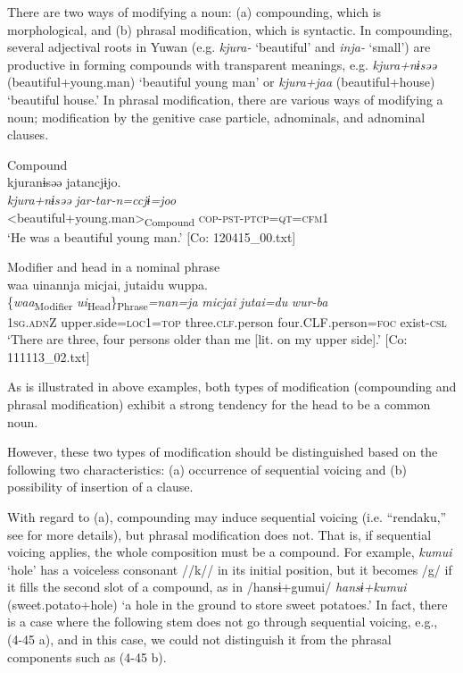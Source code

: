 There are two ways of modifying a noun: (a) compounding, which is morphological, and (b) phrasal modification, which is syntactic. In compounding, several adjectival roots in Yuwan (e.g. \textit{kjura-} ‘beautiful’ and \textit{inja-} ‘small’) are productive in forming compounds with transparent meanings, e.g. \textit{kjura+nɨsəə} (beautiful+young.man) ‘beautiful young man’ or \textit{kjura+jaa} (beautiful+house) ‘beautiful house.’ In phrasal modification, there are various ways of modifying a noun; modification by the genitive case particle, adnominals, and adnominal clauses.

\ea  \label{ex:4.45}
\ea Compound \label{ex:4.45a}\\
\glll   kjuranɨsəə  jatancjɨjo.\\
      \textit{kjura+nɨsəə}  \textit{jar-tar-n=ccjɨ=joo}\\
      <beautiful+young.man>\textsubscript{Compound}  \textsc{cop}-\textsc{pst}-\textsc{ptcp}=\textsc{qt}=\textsc{cfm}1\\
      \glt       ‘He was a beautiful young man.’ [Co: 120415\_00.txt]

\ex Modifier and head in a nominal phrase\\
\glll waa  uinannja  micjai, jutaidu  wuppa.\\
      \{\textit{waa}\textsubscript{Modifier}  \textit{ui}\textsubscript{Head}\}\textsubscript{Phrase}\textit{=nan=ja}  \textit{micjai}  \textit{jutai=du}  \textit{wur-ba}\\                                                                                                                                       
      1\textsc{sg}.\textsc{adn}Z  upper.side=\textsc{loc}1=\textsc{top}  three.\textsc{clf}.person           {}                                                           {}             four.CLF.person=\textsc{foc}  exist-\textsc{csl}\\
    \glt    ‘There are three, four persons older than me [lit. on my upper side].’   [Co: 111113\_02.txt]
  \z
\z

As is illustrated in above examples, both types of modification (compounding and phrasal modification) exhibit a strong tendency for the head to be a common noun.

However, these two types of modification should be distinguished based on the following two characteristics: (a) occurrence of sequential voicing and (b) possibility of insertion of a clause.

With regard to (a), compounding may induce sequential voicing (i.e. “rendaku,” see  for more details), but phrasal modification does not. That is, if sequential voicing applies, the whole composition must be a compound. For example, \textit{kumui} ‘hole’ has a voiceless consonant //k// in its initial position, but it becomes /g/ if it fills the second slot of a compound, as in /hansɨ+gumui/ \textit{hansɨ+kumui} (sweet.potato+hole) ‘a hole in the ground to store sweet potatoes.’ In fact, there is a case where the following stem does not go through sequential voicing, e.g., (4-45 a), and in this case, we could not distinguish it from the phrasal components such as (4-45 b).

